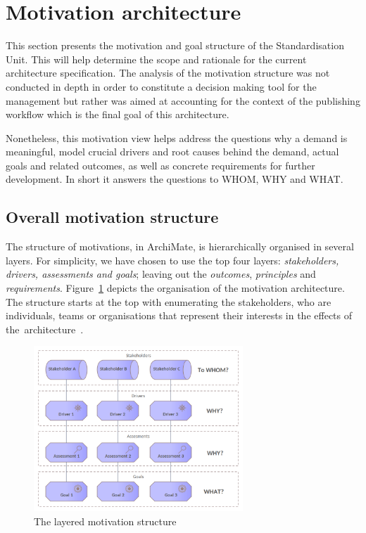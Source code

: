 \section{Motivation architecture}
\label{sec:motivation-architecture}

	This section presents the motivation and goal structure of the Standardisation Unit. This will help determine the scope and rationale for the current architecture specification. The analysis of the motivation structure was not conducted in depth in order to constitute a decision making tool for the management but rather was aimed at accounting for the context of the publishing workflow which is the final goal of this architecture.
	
	Nonetheless, this motivation view helps address the questions why a demand is meaningful, model crucial drivers and root causes behind the demand, actual goals and related outcomes, as well as concrete requirements for further development. In short it answers the questions to WHOM, WHY and WHAT.
	
	\subsection{Overall motivation structure}
	\label{sec:how-to-motivation}		
	
	The structure of motivations, in ArchiMate, is hierarchically organised in several layers. For simplicity, we have chosen to use the top four layers: \textit{stakeholders, drivers, assessments and goals}; leaving out the \textit{outcomes}, \textit{principles} and \textit{requirements}. \mbox{Figure \ref{fig:morivation-structure}} depicts the organisation of the motivation architecture. The structure starts at the top with enumerating the stakeholders, who are individuals, teams or organisations that represent their interests in the effects of \mbox{the architecture \citep{archimate3.1}}. 
	
	\begin{figure}[hbt!]
		\centering
		\includegraphics[width=0.7\textwidth]{images/views/Motivation view.png}
		\caption{The layered motivation structure}
		\label{fig:morivation-structure}
	\end{figure}
	
